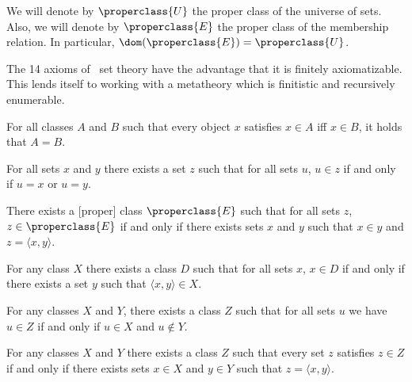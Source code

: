 \begin{node}[Notation]\label{nbg-000B}%
We will denote by $\properclass{U}$ the proper class of the universe of sets.
Also, we will denote by $\properclass{E}$ the proper class of the
membership relation.
In particular, $\dom(\properclass{E})=\properclass{U}$.
\end{node}

\begin{node}[Axioms]\label{nbg-0004}%
The 14 axioms of \NBG\ set theory have the advantage that it is finitely
axiomatizable. This lends itself to working with a metatheory which is
finitistic and recursively enumerable.

\begin{node}\label{nbg-0005}%
For all classes $A$ and $B$ such that every object $x$ satisfies $x\in A$
iff $x\in B$, it holds that $A=B$.
\end{node}

\begin{node}\label{nbg-0006}%
For all sets $x$ and $y$ there exists a set $z$ such that for all sets
$u$, $u\in z$ if and only if $u=x$ or $u=y$.
\end{node}

\begin{node}\label{nbg-0008}%
There exists a [proper] class $\properclass{E}$ such that for all sets $z$,
$z\in\properclass{E}$ if and only if there exists sets $x$ and $y$ such
that $x\in y$ and $z=\langle x,y\rangle$.
\end{node}

\begin{node}\label{nbg-0009}%
For any class $X$ there exists a class $D$ such that for all sets $x$,
$x\in D$ if and only if there exists a set $y$ such that $\langle x,y\rangle\in X$.
\end{node}

\begin{node}\label{nbg-000G}%
For any classes $X$ and $Y$, there exists a class $Z$ such that for all
sets $u$ we have $u\in Z$ if and only if $u\in X$ and $u\notin Y$.
\end{node}

\begin{node}\label{nbg-000H}%
For any classes $X$ and $Y$ there exists a class $Z$ such that every set
$z$ satisfies $z\in Z$ if and only if there exists sets $x\in X$ and
$y\in Y$ such that $z=\langle x,y\rangle$.
\end{node}


\end{node}

